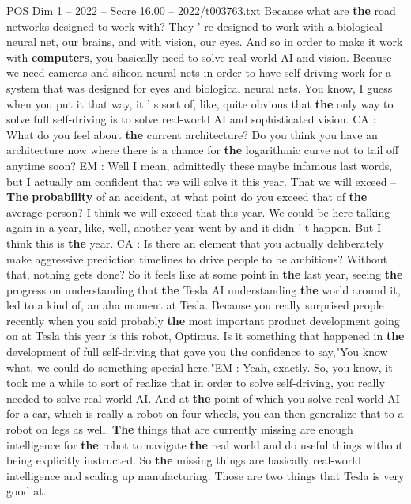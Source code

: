 \begin{textsample}{POS Dim 1 – 2022 – Score 16.00 – 2022/t003763.txt}
Because what are \textbf{the} road networks designed to work with?
They ' re designed to work with a biological neural net, our brains, and with vision, our eyes.
And so in order to make it work with \textbf{computers}, you basically need to solve real-world AI and vision.
Because we need cameras and silicon neural nets in order to have self-driving work for a system that was designed for eyes and biological neural nets.
You know, I guess when you put it that way, it ' s sort of, like, quite obvious that \textbf{the} only way to solve full self-driving is to solve real-world AI and sophisticated vision.
CA : What do you feel about \textbf{the} current architecture?
Do you think you have an architecture now where there is a chance for \textbf{the} logarithmic curve not to tail off anytime soon?
EM : Well I mean, admittedly these maybe infamous last words, but I actually am confident that we will solve it this year.
That we will exceed -- \textbf{The} \textbf{probability} of an accident, at what point do you exceed that of \textbf{the} average person?
I think we will exceed that this year.
We could be here talking again in a year, like, well, another year went by and it didn ' t happen.
But I think this is \textbf{the} year.
CA : Is there an element that you actually deliberately make aggressive prediction timelines to drive people to be ambitious?
Without that, nothing gets done?
So it feels like at some point in \textbf{the} last year, seeing \textbf{the} progress on understanding that \textbf{the} Tesla AI understanding \textbf{the} world around it, led to a kind of, an aha moment at Tesla.
Because you really surprised people recently when you said probably \textbf{the} most important product development going on at Tesla this year is this robot, Optimus.
Is it something that happened in \textbf{the} development of full self-driving that gave you \textbf{the} confidence to say,"You know what, we could do something special here."EM : Yeah, exactly.
So, you know, it took me a while to sort of realize that in order to solve self-driving, you really needed to solve real-world AI.
And at \textbf{the} point of which you solve real-world AI for a car, which is really a robot on four wheels, you can then generalize that to a robot on legs as well. \textbf{The} things that are currently missing are enough intelligence for \textbf{the} robot to navigate \textbf{the} real world and do useful things without being explicitly instructed.
So \textbf{the} missing things are basically real-world intelligence and scaling up manufacturing.
Those are two things that Tesla is very good at.

\end{textsample}
